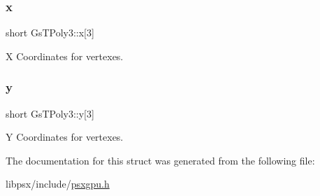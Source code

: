 \mbox{\label{structGsTPoly3_ace20bf105754c114fbc0edd4f6da6f39}} 
\subsubsection{\texorpdfstring{x}{x}}
{\footnotesize\ttfamily short Gs\+T\+Poly3\+::x\mbox{[}3\mbox{]}}



X Coordinates for vertexes. 

\mbox{\label{structGsTPoly3_a224a67e5dbe4fddc7a638979a8a6501e}} 
\subsubsection{\texorpdfstring{y}{y}}
{\footnotesize\ttfamily short Gs\+T\+Poly3\+::y\mbox{[}3\mbox{]}}



Y Coordinates for vertexes. 



The documentation for this struct was generated from the following file\+:\begin{DoxyCompactItemize}
\item 
libpsx/include/\hyperlink{psxgpu_8h}{psxgpu.\+h}\end{DoxyCompactItemize}
